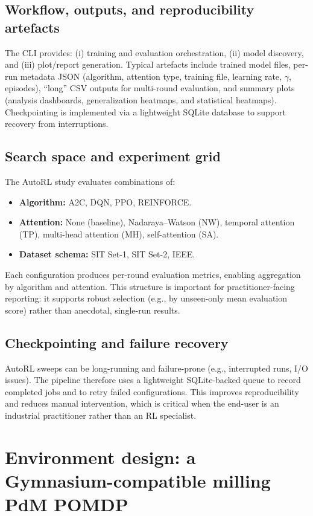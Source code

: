 \documentclass[11pt]{article}
\begin{document}
\subsection{Workflow, outputs, and reproducibility artefacts}
The CLI provides: (i) training and evaluation orchestration, (ii) model discovery, and (iii) plot/report generation. Typical artefacts include trained model files, per-run metadata JSON (algorithm, attention type, training file, learning rate, $\gamma$, episodes), ``long'' CSV outputs for multi-round evaluation, and summary plots (analysis dashboards, generalization heatmaps, and statistical heatmaps). Checkpointing is implemented via a lightweight SQLite database to support recovery from interruptions.

\subsection{Search space and experiment grid}
The AutoRL study evaluates combinations of:
\begin{itemize}
	\item \textbf{Algorithm:} A2C, DQN, PPO, REINFORCE.
	\item \textbf{Attention:} None (baseline), Nadaraya--Watson (NW), temporal attention (TP), multi-head attention (MH), self-attention (SA).
	\item \textbf{Dataset schema:} SIT Set-1, SIT Set-2, IEEE.
\end{itemize}
Each configuration produces per-round evaluation metrics, enabling aggregation by algorithm and attention. This structure is important for practitioner-facing reporting: it supports robust selection (e.g., by unseen-only mean evaluation score) rather than anecdotal, single-run results.

\subsection{Checkpointing and failure recovery}
AutoRL sweeps can be long-running and failure-prone (e.g., interrupted runs, I/O issues). The pipeline therefore uses a lightweight SQLite-backed queue to record completed jobs and to retry failed configurations. This improves reproducibility and reduces manual intervention, which is critical when the end-user is an industrial practitioner rather than an RL specialist.

\section{Environment design: a Gymnasium-compatible milling PdM POMDP}
\label{sec:env}
\end{document}
